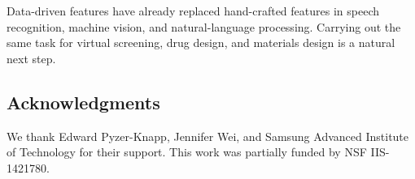 \documentclass{article}
\begin{document}
Data-driven features have already replaced hand-crafted features in speech recognition, machine vision, and natural-language processing.
Carrying out the same task for virtual screening, drug design, and materials design is a natural next step.

\subsection*{Acknowledgments}
We thank Edward Pyzer-Knapp, Jennifer Wei, and Samsung Advanced Institute of Technology for their support.
This work was partially funded by NSF IIS-1421780.



\end{document}

